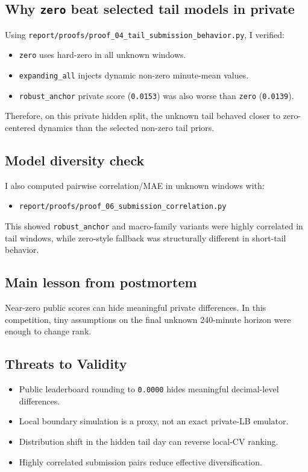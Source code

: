 \subsection{Why \texttt{zero} beat selected tail models in private}
Using \texttt{report/proofs/proof\_04\_tail\_submission\_behavior.py}, I verified:
\begin{itemize}[leftmargin=1.5em]
  \item \texttt{zero} uses hard-zero in all unknown windows.
  \item \texttt{expanding\_all} injects dynamic non-zero minute-mean values.
  \item \texttt{robust\_anchor} private score (\texttt{0.0153}) was also worse than \texttt{zero} (\texttt{0.0139}).
\end{itemize}

Therefore, on this private hidden split, the unknown tail behaved closer to zero-centered dynamics than the selected non-zero tail priors.

\subsection{Model diversity check}
I also computed pairwise correlation/MAE in unknown windows with:
\begin{itemize}[leftmargin=1.5em]
  \item \texttt{report/proofs/proof\_06\_submission\_correlation.py}
\end{itemize}
This showed \texttt{robust\_anchor} and macro-family variants were highly correlated in tail windows, while zero-style fallback was structurally different in short-tail behavior.

\subsection{Main lesson from postmortem}
Near-zero public scores can hide meaningful private differences. In this competition, tiny assumptions on the final unknown 240-minute horizon were enough to change rank.

\subsection{Threats to Validity}
\begin{itemize}[leftmargin=1.5em]
  \item Public leaderboard rounding to \texttt{0.0000} hides meaningful decimal-level differences.
  \item Local boundary simulation is a proxy, not an exact private-LB emulator.
  \item Distribution shift in the hidden tail day can reverse local-CV ranking.
  \item Highly correlated submission pairs reduce effective diversification.
\end{itemize}
